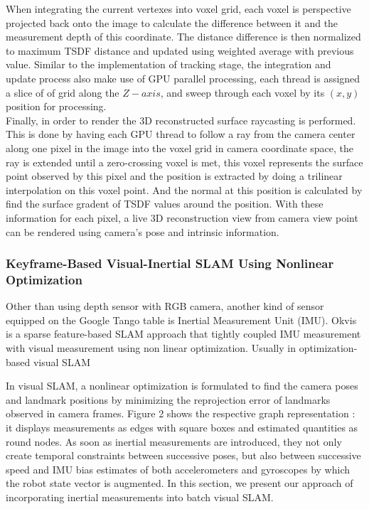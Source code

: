 \documentclass[12pt,twoside]{article}
\begin{document}
When integrating the current vertexes into voxel grid, each voxel is perspective projected back onto the image to calculate the difference between it and the measurement depth of this coordinate. The distance difference is then normalized to maximum TSDF distance and updated using weighted average with   previous value. Similar to the implementation of tracking stage, the integration and update process also make use of GPU parallel processing, each thread is assigned a slice of of grid along the $Z-axis$, and sweep through each voxel by its $(x,y)$ position for processing.\\
Finally, in order to render the 3D reconstructed surface raycasting is performed. This is done by having each GPU thread to follow a ray from the camera center along one pixel in the image into the voxel grid in camera coordinate space, the ray is extended until a zero-crossing voxel is met, this voxel represents the surface point observed by this pixel and the position is extracted by doing a trilinear interpolation on this voxel point. And the normal at this position is calculated by find the surface gradent of TSDF values around the position. With these information for each pixel, a live 3D reconstruction view from camera view point can be rendered using camera's pose and intrinsic information.


\subsubsection{Keyframe-Based Visual-Inertial SLAM Using
Nonlinear Optimization}
Other than using depth sensor with RGB camera, another kind of sensor equipped on the Google Tango table is Inertial Measurement Unit (IMU). Okvis\cite{leutenegger2015keyframe} is a sparse feature-based SLAM approach that tightly coupled IMU measurement with visual measurement using non linear optimization.
Usually in optimization-based visual SLAM


In visual SLAM, a nonlinear optimization is formulated to
find the camera poses and landmark positions by minimizing
the reprojection error of landmarks observed in camera
frames. Figure 2 shows the respective graph representation :
it displays measurements as edges with square boxes and
estimated quantities as round nodes. As soon as inertial
measurements are introduced, they not only create temporal
constraints between successive poses, but also between successive
speed and IMU bias estimates of both accelerometers
and gyroscopes by which the robot state vector is augmented.
In this section, we present our approach of incorporating
inertial measurements into batch visual SLAM.
\end{document}
